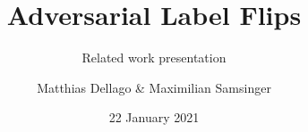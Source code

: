 \documentclass[10pt,usepdftitle=false,aspectratio=169]{beamer}
\title{Adversarial Label Flips}
\subtitle{Related work presentation}
\author{Matthias Dellago \& Maximilian Samsinger}
\date{22 January 2021}
\begin{document}
\DeclarePairedDelimiter\abs{\lvert}{\rvert}%
\DeclarePairedDelimiter\norm{\lVert}{\rVert}%
\DeclarePairedDelimiter\ceil{\lceil}{\rceil}
\DeclarePairedDelimiter\floor{\lfloor}{\rfloor}

\begin{frame}[plain]
	\maketitle
\end{frame}	

%
%

\end{document}
